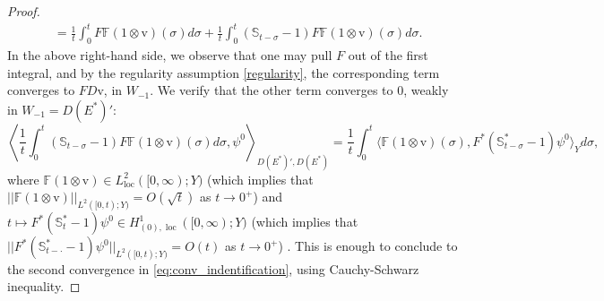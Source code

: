 \documentclass[10pt]{article}
\newcommand{\oploc}{\operatorname{loc}}
\begin{document}
\begin{proof}
\begin{align*}
&= \frac{1}{t} \int_0^t F \mathbb{F}(1\otimes \mathrm{v})(\sigma)d\sigma + \frac{1}{t} \int_0^t (\mathbb{S}_{t-\sigma}-1)F\mathbb{F} (1\otimes \mathrm{v})(\sigma)d\sigma. 
\end{align*}
In the above right-hand side, we observe that one may pull $F$ out of the first integral, and by the regularity assumption \eqref{regularity}, the corresponding term converges to $FD \mathrm{v}$, in $W_{-1}$. We verify that the other term converges to $0$, weakly in $W_{-1} = D(E^*)'$: 
\[
\left\langle \frac{1}{t} \int_0^t (\mathbb{S}_{t-\sigma}-1)F\mathbb{F} (1\otimes \mathrm{v})(\sigma)d\sigma , \psi^0 \right \rangle_{D(E^*)',D(E^*)} = \frac{1}{t} \int_0^t \langle \mathbb{F}(1\otimes \mathrm{v})(\sigma) , F^*(\mathbb{S}_{t-\sigma}^*-1) \psi^0 \rangle_Y d\sigma,
\]
where $\mathbb{F}(1\otimes \mathrm{v}) \in L^2_{\oploc}([0,\infty);Y)$ (which implies that  $||\mathbb{F}(1\otimes \mathrm{v})||_{L^2([0,t);Y)} = O(\sqrt{t})$ as $t\to 0^+$) and $t \mapsto F^*(\mathbb{S}_t^*-1) \psi^0 \in H^1_{(0),\oploc}([0,\infty);Y) $ (which implies that  $||F^*(\mathbb{S}_{t-\cdot}^*-1) \psi^0||_{L^2([0,t);Y)}= O({t})$ as $t\to 0^+$) . This is enough to conclude to the second convergence in \eqref{eq:conv_indentification}, using Cauchy-Schwarz inequality.
\end{proof}
\end{document}
